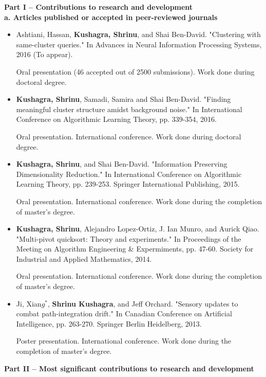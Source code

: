 \documentclass[12pt]{article}
\begin{document}
\linespread{0.901}

\noindent\textbf{Part I – Contributions to research and development}\\
\textbf{a. Articles published or accepted in peer-reviewed journals }

\begin{itemize}[noitemsep]
\item   Ashtiani, Hassan, \textbf{Kushagra, Shrinu}, and Shai Ben-David. "Clustering with same-cluster queries." In Advances in Neural Information Processing Systems, 2016 (To appear).

Oral presentation (46 accepted out of 2500 submissions). Work done during doctoral degree.

\item  \textbf{Kushagra, Shrinu}, Samadi, Samira and Shai Ben-David. "Finding meaningful cluster structure amidst background noise." In International Conference on Algorithmic Learning Theory, pp. 339-354, 2016.

Oral presentation. International conference. Work done during doctoral degree.
 
\item \textbf{Kushagra, Shrinu}, and Shai Ben-David. "Information Preserving Dimensionality Reduction." In International Conference on Algorithmic Learning Theory, pp. 239-253. Springer International Publishing, 2015.

Oral presentation. International conference. Work done during the completion of master's degree.

\item \textbf{Kushagra, Shrinu}, Alejandro Lopez-Ortiz, J. Ian Munro, and Aurick Qiao. "Multi-pivot quicksort: Theory and experiments." In Proceedings of the Meeting on Algorithm Engineering \& Expermiments, pp. 47-60. Society for Industrial and Applied Mathematics, 2014.

Oral presentation. International conference. Work done during the completion of master's degree.

\item Ji, Xian$g^*$, \textbf{Shrinu Kushagra}, and Jeff Orchard. "Sensory updates to combat path-integration drift." In Canadian Conference on Artificial Intelligence, pp. 263-270. Springer Berlin Heidelberg, 2013.

Poster presentation. International conference. Work done during the completion of master's degree.
\end{itemize}

\noindent\textbf{Part II – Most significant contributions to research and development}
\end{document}
